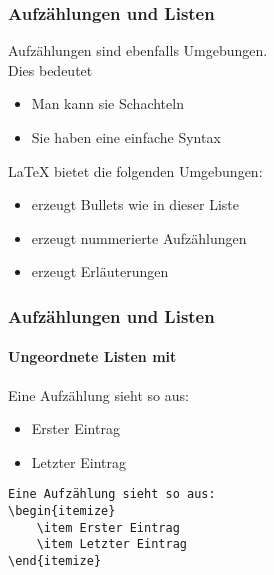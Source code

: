 \begin{frame}
    \frametitle{Aufzählungen und Listen}

    Aufzählungen sind ebenfalls Umgebungen.\\
    Dies bedeutet
    \begin{itemize}
        \item Man kann sie Schachteln
        \item Sie haben eine einfache Syntax
    \end{itemize}
    
    \bigskip
    \LaTeX{} bietet die folgenden Umgebungen:
    \begin{itemize}
        \item {} erzeugt Bullets wie in dieser Liste
        \item {} erzeugt nummerierte Aufzählungen
        \item {} erzeugt Erläuterungen
    \end{itemize}
\end{frame}


\begin{frame}[fragile]
    \frametitle{Aufzählungen und Listen}
    \framesubtitle{Ungeordnete Listen mit }
    
    Eine Aufzählung sieht so aus:
    \begin{itemize}
        \item Erster Eintrag
        \item Letzter Eintrag
    \end{itemize}
    
    \bigskip
    \begin{verbatim}
Eine Aufzählung sieht so aus:
\begin{itemize}
    \item Erster Eintrag
    \item Letzter Eintrag
\end{itemize}
    \end{verbatim}
\end{frame}


